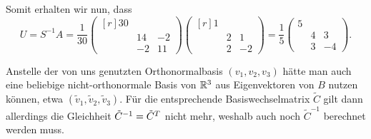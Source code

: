 Somit erhalten wir nun, dass
\[
    U
  = S^{-1} A
  = \frac{1}{30}
    \begin{pmatrix*}[r]
      30  &     &     \\
          & 14  & -2  \\
          & -2  & 11
    \end{pmatrix*}
    \begin{pmatrix*}[r]
      1 &   &     \\
        & 2 &  1  \\
        & 2 & -2
    \end{pmatrix*}
  = \frac{1}{5}
    \begin{pmatrix}
      5 &   &     \\
        & 4 &  3  \\
        & 3 & -4
    \end{pmatrix}.
\]

\begin{remark}
  Anstelle der von uns genutzten Orthonormalbasis $(v_1, v_2, v_3)$ hätte man auch eine beliebige nicht-orthonormale Basis von $\mathbb{R}^3$ aus Eigenvektoren von $B$ nutzen können, etwa $(\tilde{v}_1, \tilde{v}_2, \tilde{v}_3)$.
  Für die entsprechende Basiswechselmatrix $\tilde{C}$ gilt dann allerdings die Gleichheit $\tilde{C}^{-1} = \tilde{C}^T$ nicht mehr, weshalb auch noch $\tilde{C}^{-1}$ berechnet werden muss.
\end{remark}
